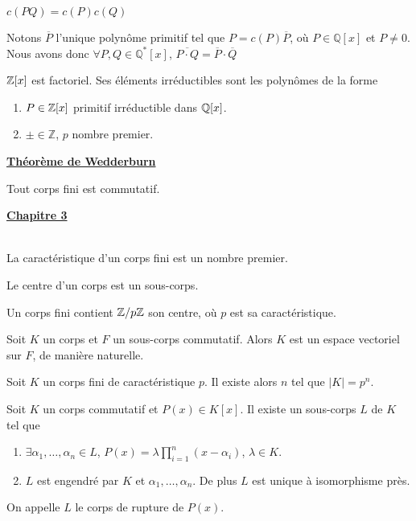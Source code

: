 \documentclass[12pt,a4paper]{article}
\begin{document}
\begin{flushleft}
\begin{lem}
$c(PQ) = c(P)c(Q)$
\end{lem}

\begin{rem}
Notons $\overline{P}$ l'unique polynôme primitif tel que $P = c(P) \overline{P}$, où $P \in \mathbb{Q}[x]$ et $P \neq 0$. Nous avons donc $\forall P, Q \in \mathbb{Q}^* [x] $, $\overline{P \cdot Q} = \overline{P} \cdot \overline{Q}$
\end{rem}

\begin{thm}
$\mathbb{Z} [x]$ est factoriel. Ses éléments irréductibles sont les polynômes de la forme
\begin{enumerate}
\item $P \in \mathbb{Z} [x]$ primitif irréductible dans $\mathbb{Q} [x]$.
\item $\pm \in \mathbb{Z}$, $p$ nombre premier.
\end{enumerate}
\end{thm}

\textbf{\underline{Théorème de Wedderburn}}
\begin{thm}
Tout corps fini est commutatif.
\end{thm}

\textbf{\underline{Chapitre 3}}\\~\\

\begin{prop} 
La caractéristique d'un corps fini est un nombre premier.
\end{prop}

\begin{prop}
Le centre d'un corps est un sous-corps.
\end{prop}

\begin{cor}
Un corps fini contient $\mathbb{Z} / p \mathbb{Z}$ son centre, où $p$ est sa caractéristique.
\end{cor}

\begin{prop}
Soit $K$ un corps et $F$ un sous-corps commutatif. Alors $K$ est un espace vectoriel sur $F$, de manière naturelle.
\end{prop}

\begin{cor}
Soit $K$ un corps fini de caractéristique $p$. Il existe alors $n$ tel que $|K| = p^n$.
\end{cor}

\begin{thm}
Soit $K$ un corps commutatif et $P(x) \in K[x]$. Il existe un sous-corps $L$ de $K$ tel que
\begin{enumerate}
\item $\exists \alpha_1, \ldots , \alpha_n \in L$, $P(x) = \lambda \prod_{i = 1}^{n} (x - \alpha_i)$, $\lambda \in K$.
\item $L$ est engendré par $K$ et $\alpha_1, \ldots , \alpha_n$. De plus $L$ est unique à isomorphisme près.
\end{enumerate}
On appelle $L$ le corps de rupture de $P(x)$.
\end{thm}



\end{flushleft}
\end{document}
